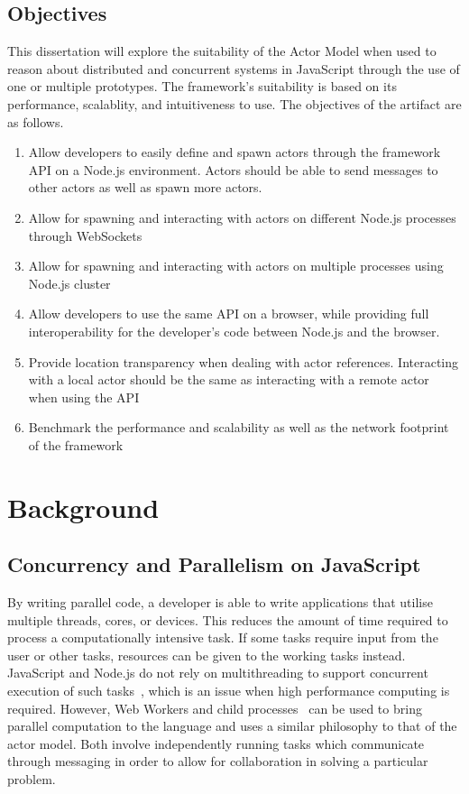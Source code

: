 \documentclass[12pt, a4paper]{report}
\theoremstyle{definition}
\theoremstyle{definition}%
\theoremstyle{definition}%
\theoremstyle{definition}%
\theoremstyle{definition}%
\theoremstyle{definition}%
\begin{document}
\section{Objectives}
This dissertation will explore the suitability of the Actor Model when used to reason about distributed and concurrent systems in JavaScript through the use of one or multiple prototypes. The framework's suitability is based on its performance, scalablity, and intuitiveness to use. The objectives of the artifact are as follows.
\begin{enumerate}
    \item Allow developers to easily define and spawn actors through the framework API on a Node.js environment. Actors should be able to send messages to other actors as well as spawn more actors.
    \item Allow for spawning and interacting with actors on different Node.js processes through WebSockets
    \item Allow for spawning and interacting with actors on multiple processes using Node.js cluster
    \item Allow developers to use the same API on a browser, while providing full interoperability for the developer's code between Node.js and the browser.
    \item Provide location transparency when dealing with actor references. Interacting with a local actor should be the same as interacting with a remote actor when using the API
    \item Benchmark the performance and scalability as well as the network footprint of the framework
\end{enumerate}

\chapter{Background}
\section{Concurrency and Parallelism on JavaScript}
By writing parallel code, a developer is able to write applications that utilise multiple threads, cores, or devices. This reduces the amount of time required to process a computationally intensive task. If some tasks require input from the user or other tasks, resources can be given to the working tasks instead. JavaScript and Node.js do not rely on multithreading to support concurrent execution of such tasks~\cite{highperformance}, which is an issue when high performance computing is required. However, Web Workers and child processes~\cite{concurrencyjs}\cite{spidersjs} can be used to bring parallel computation to the language and uses a similar philosophy to that of the actor model. Both involve independently running tasks which communicate through messaging in order to allow for collaboration in solving a particular problem.
\end{document}
